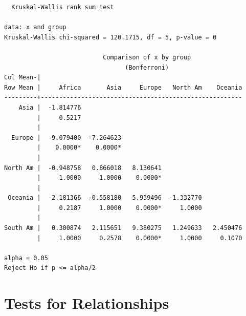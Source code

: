 \documentclass[
  letterpaper,
]{book}
\newenvironment{Shaded}{\begin{snugshade}}{\end{snugshade}}
\newcommand{\AttributeTok}[1]{\textcolor[rgb]{0.40,0.45,0.13}{#1}}
\newcommand{\CommentTok}[1]{\textcolor[rgb]{0.37,0.37,0.37}{#1}}
\newcommand{\ConstantTok}[1]{\textcolor[rgb]{0.56,0.35,0.01}{#1}}
\newcommand{\ControlFlowTok}[1]{\textcolor[rgb]{0.00,0.23,0.31}{\textbf{#1}}}
\newcommand{\FunctionTok}[1]{\textcolor[rgb]{0.28,0.35,0.67}{#1}}
\newcommand{\NormalTok}[1]{\textcolor[rgb]{0.00,0.23,0.31}{#1}}
\newcommand{\SpecialCharTok}[1]{\textcolor[rgb]{0.37,0.37,0.37}{#1}}
\newcommand{\StringTok}[1]{\textcolor[rgb]{0.13,0.47,0.30}{#1}}
\begin{document}
\begin{Shaded}
\end{Shaded}

\begin{verbatim}
  Kruskal-Wallis rank sum test

data: x and group
Kruskal-Wallis chi-squared = 120.1715, df = 5, p-value = 0

                           Comparison of x by group                            
                                 (Bonferroni)                                  
Col Mean-|
Row Mean |     Africa       Asia     Europe   North Am    Oceania
---------+-------------------------------------------------------
    Asia |  -1.814776
         |     0.5217
         |
  Europe |  -9.079400  -7.264623
         |    0.0000*    0.0000*
         |
North Am |  -0.948758   0.866018   8.130641
         |     1.0000     1.0000    0.0000*
         |
 Oceania |  -2.181366  -0.558180   5.939496  -1.332770
         |     0.2187     1.0000    0.0000*     1.0000
         |
South Am |   0.300874   2.115651   9.380275   1.249633   2.450476
         |     1.0000     0.2578    0.0000*     1.0000     0.1070

alpha = 0.05
Reject Ho if p <= alpha/2
\end{verbatim}

\section{Tests for Relationships}\label{tests-for-relationships}
\end{document}
